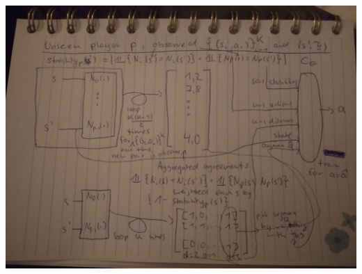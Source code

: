 \documentclass[a4paper, 11pt]{article}
\begin{document}
	\includegraphics[scale=.5]{architecture}
	
	
	
	
	
\end{document}
